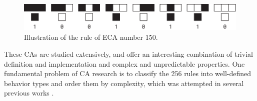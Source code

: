 \begin{figure}[htbp]
  \centering
  \includegraphics[width=.95\linewidth]{figures/eca_150_rule}
  \caption{Illustration of the rule of \ac{ECA} number 150.}
  \label{fig:eca_150_rule}
\end{figure}

These \acp{CA} are studied extensively, and offer an interesting combination of
trivial definition and implementation and complex and unpredictable properties.
One fundamental problem of \ac{CA} research is to classify the 256 rules into
well-defined behavior types and order them by complexity, which was attempted in
several previous works \parencite{wuenscheGlobalDynamicsCellular1992,
  gutowitzTransientsCyclesComplexity1991,
  wuenscheClassifyingCellularAutomata1999, wolframNewKindScience2002,
  zenilCompressionBasedInvestigationDynamical2010,
  hudcovaClassificationComplexSystems2020,
  hudcovaComputationalHierarchyElementary2021}.

